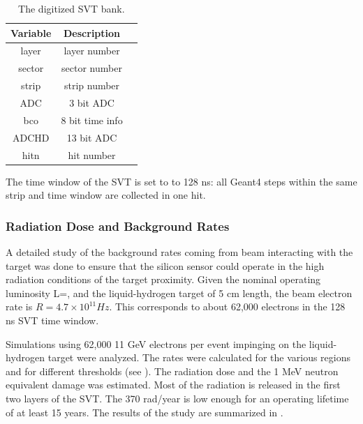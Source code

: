 \begin{table}[h]
	\begin{center}
		\begin{tabular}{| c | c | c |}
			\hline \hline
			Variable  & Description   \\
			\hline
               layer  &        layer number    \\
              sector  &       sector number    \\
               strip  &        strip number    \\
                 ADC  &           3 bit ADC    \\
                 bco  &     8 bit time info    \\
               ADCHD  &          13 bit ADC    \\
                hitn  &          hit number    \\
			\hline \hline
		\end{tabular}
	\end{center}
	\caption{The digitized SVT bank.}\label{tab:bstBank}
\end{table}

The time window  of the SVT is set to to 128 ns: all Geant4 steps within the same strip and time window are collected in one hit.

\subsubsection{Radiation Dose and Background Rates}
A detailed study of the background rates coming from beam interacting with the target was done to ensure that the silicon sensor
could operate in the high radiation conditions of the target proximity.
Given the nominal operating luminosity L=\cLuminosity, and the liquid-hydrogen target of 5 cm length, the beam electron rate
is $R=4.7 \times 10^{11} Hz$. This corresponds to about 62,000 electrons in the 128 ns SVT time window.

Simulations using 62,000 11 GeV electrons per event impinging on the liquid-hydrogen target were analyzed.
The rates were calculated for the various regions and for different thresholds (see ).
The radiation dose and the 1 MeV neutron equivalent damage was estimated. Most of the radiation
is released in the first two layers of the SVT.
The 370 rad/year is low enough for an operating lifetime of at least 15 years. The results of the study
are summarized in .


